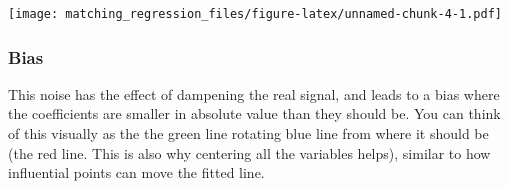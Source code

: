 \documentclass[
]{article}
\newenvironment{Shaded}{\begin{snugshade}}{\end{snugshade}}
\newcommand{\DataTypeTok}[1]{\textcolor[rgb]{0.13,0.29,0.53}{#1}}
\newcommand{\DecValTok}[1]{\textcolor[rgb]{0.00,0.00,0.81}{#1}}
\newcommand{\KeywordTok}[1]{\textcolor[rgb]{0.13,0.29,0.53}{\textbf{#1}}}
\newcommand{\NormalTok}[1]{#1}
\newcommand{\OperatorTok}[1]{\textcolor[rgb]{0.81,0.36,0.00}{\textbf{#1}}}
\newcommand{\StringTok}[1]{\textcolor[rgb]{0.31,0.60,0.02}{#1}}
\begin{document}
\begin{Shaded}
\end{Shaded}

\texttt{[image: matching\_regression\_files/figure-latex/unnamed-chunk-4-1.pdf]}

\hypertarget{bias}{%
\subsubsection{Bias}\label{bias}}

This noise has the effect of dampening the real signal, and leads to a
bias where the coefficients are smaller in absolute value than they
should be. You can think of this visually as the the green line rotating
blue line from where it should be (the red line. This is also why
centering all the variables helps), similar to how influential points
can move the fitted line.
\end{document}
